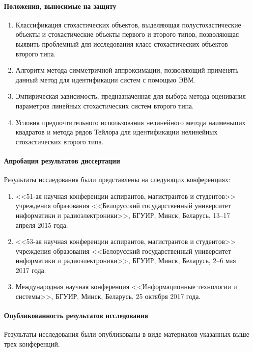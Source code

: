 \paragraph{Положения, выносимые на защиту}

\begin{enumerate}
\item Классификация стохастических объектов, выделяющая полустохастические
  объекты и стохастические объекты первого и второго типов,
  позволяющая выявить проблемный для исследования класс стохастических
  объектов второго типа.
\item Алгоритм метода симметричной аппроксимации,
  позволяющий применять данный метод для идентификации систем с помощью ЭВМ.
\item Эмпирическая зависимость, предназначенная для выбора метода
  оценивания параметров линейных стохастических систем второго типа.
\item Условия предпочтительного использования нелинейного метода наименьших
  квадратов и метода рядов Тейлора для идентификации нелинейных стохастических
  второго типа.
\end{enumerate}

\paragraph{Апробация результатов диссертации}
Результаты исследования были представлены на следующих конференциях:
\begin{enumerate}
\item <<51-ая научная конференции аспирантов, магистрантов и студентов>>
  учреждения образования
  <<Белорусский государственный университет информатики и радиоэлектроники>>,
  БГУИР, Минск, Беларусь, 13--17 апреля 2015 года.
\item <<53-ая научная конференции аспирантов, магистрантов и студентов>>
  учреждения образования
  <<Белорусский государственный университет информатики и радиоэлектроники>>,
  БГУИР, Минск, Беларусь, 2--6 мая 2017 года.
\item Международная научная конференция
  <<Информационные технологии и системы>>,
  БГУИР, Минск, Беларусь, 25 октября 2017 года.
\end{enumerate}

\paragraph{Опубликованность результатов исследования}
Результаты исследования были опубликованы в виде материалов
указанных выше трех конференций.

